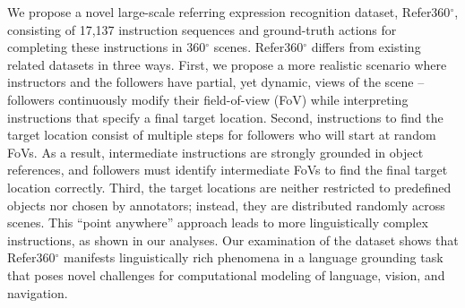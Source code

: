 We propose a novel large-scale referring expression recognition dataset, Refer360$^{\circ}$, consisting of 17,137 instruction sequences and ground-truth actions for completing these instructions in 360$^{\circ}$ scenes. Refer360$^{\circ}$ differs from existing related datasets in three ways. First, we propose a more realistic scenario where instructors and the followers have partial, yet dynamic, views of the scene – followers continuously modify their field-of-view (FoV) while interpreting instructions that specify a final target location. Second, instructions to find the target location consist of multiple steps for followers who will start at random FoVs. As a result, intermediate instructions are strongly grounded in object references, and followers must identify intermediate FoVs to find the final target location correctly. Third, the target locations are neither restricted to predefined objects nor chosen by annotators; instead, they are distributed randomly across scenes. This “point anywhere” approach leads to more linguistically complex instructions, as shown in our analyses. Our examination of the dataset shows that Refer360$^{\circ}$ manifests linguistically rich phenomena in a language grounding task that poses novel challenges for computational modeling of language, vision, and navigation.
